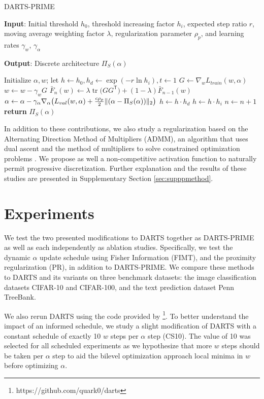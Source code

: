 \documentclass[letterpaper]{article} \usepackage{aaai22}  \usepackage{times}  \usepackage{helvet}  \usepackage{courier}  \usepackage[hyphens]{url}  \usepackage{graphicx} \urlstyle{rm} \def\UrlFont{\rm}  \usepackage{natbib}  \usepackage{caption} \DeclareCaptionStyle{ruled}{labelfont=normalfont,labelsep=colon,strut=off} \frenchspacing  \setlength{\pdfpagewidth}{8.5in}  \setlength{\pdfpageheight}{11in}  \usepackage{algorithm}
\DeclareMathOperator{\tr}{tr}
\DeclarePairedDelimiter{\norm}{\lVert}{\rVert}
\begin{document}
\begin{algorithm}[tb]
\caption{DARTS-PRIME}
\label{alg:algorithm}
 \small
\textbf{Input}: Initial threshold $h_0$, threshold increasing factor $h_i$, expected step ratio $r$, moving average weighting factor $\lambda$, regularization parameter $\rho_p$, and learning rates $\gamma_w$, $\gamma_\alpha$ 

\textbf{Output}: Discrete architecture $\Pi_S(\alpha)$ 

\begin{algorithmic}[1] 
\STATE Initialize $\alpha, w$; let $h\gets h_0, h_d\gets \exp(-r\ln{h_i}), t\gets1$ 
\STATE $G \gets \nabla_w L_{train}(w,\alpha)$
\STATE $w \gets w - \gamma_w G$ \STATE $\bar{F}_n(w) \gets \lambda \tr\big(G G^\mathsf{T} \big) + (1-\lambda) \bar{F}_{n-1}(w)$
\STATE $\alpha \gets \alpha - \gamma_\alpha \nabla_\alpha \big(L_{val}(w,\alpha) + \frac{c\rho_{p}}2\norm{(\alpha-\Pi_S(\alpha))}_2\big)$
\STATE $h\gets h\cdot h_d$
\ELSE
\STATE $h\gets h\cdot h_i$
\ENDIF
\STATE $n\gets n+1$
\ENDWHILE
\STATE \textbf{return} $\Pi_S(\alpha)$
\end{algorithmic}
\end{algorithm}

In addition to these contributions, we also study a regularization based on the Alternating Direction Method of Multipliers (ADMM), an algorithm that uses dual ascent and the method of multipliers to solve constrained optimization problems \cite{boyd2010}. We propose as well a non-competitive activation function to naturally permit progressive discretization. Further explanation and the results of these studies are presented in Supplementary Section \ref{sec:supppmethod}.

\section{Experiments}
We test the two presented modifications to DARTS together as DARTS-PRIME as well as each independently as ablation studies. Specifically, we test the dynamic $\alpha$ update schedule using Fisher Information (FIMT), and the proximity regularization (PR), in addition to DARTS-PRIME. We compare these methods to DARTS and its variants on three benchmark datasets: the image classification datasets CIFAR-10 and CIFAR-100, and the text prediction dataset Penn TreeBank.

We also rerun DARTS using the code provided by  \cite{liu2018darts}\footnote{https://github.com/quark0/darts}. To better understand the impact of an informed schedule, we study a slight modification of DARTS with a constant schedule of exactly 10 $w$ steps per $\alpha$ step (CS10). The value of 10 was selected for all scheduled experiments as we hypothesize that more $w$ steps should be taken per $\alpha$ step to aid the bilevel optimization approach local minima in $w$ before optimizing $\alpha$.
\end{document}
